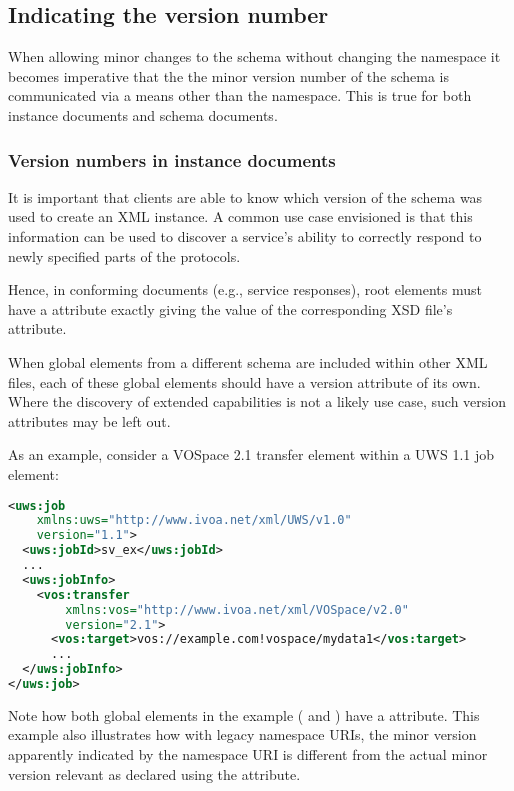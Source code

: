 \documentclass[10pt,a4paper]{ivoa}
\begin{document}
\subsection{Indicating the version number}

When allowing minor changes to the schema without changing the
namespace it becomes imperative that the the minor version number of the schema
is communicated via a means other than the namespace.  This is true for
both instance documents and schema documents.

\subsubsection{Version numbers in instance documents}

It is important that
clients are able to know which version of the schema was used to create an XML
instance.  A common use case envisioned is that
this information can be used to discover a service's ability to
correctly respond to newly specified parts of the protocols. 

Hence, in conforming documents (e.g., service responses), 
root elements must have
a 
attribute exactly giving the value of the corresponding XSD file's
 attribute.

When global elements from a different schema are included within other
XML files, each of these global elements should have a version attribute
of its own.  Where the discovery of extended capabilities is not a
likely use case, such version attributes may be left out.

As an example, consider a VOSpace 2.1 transfer element within a UWS 1.1
job element:

\begin{lstlisting}[language=xml]
<uws:job 
    xmlns:uws="http://www.ivoa.net/xml/UWS/v1.0" 
    version="1.1">
  <uws:jobId>sv_ex</uws:jobId>
  ...
  <uws:jobInfo>
    <vos:transfer 
        xmlns:vos="http://www.ivoa.net/xml/VOSpace/v2.0"
        version="2.1">
      <vos:target>vos://example.com!vospace/mydata1</vos:target>
      ...
  </uws:jobInfo>
</uws:job>
\end{lstlisting}

Note how both global elements in the example ( and
) have a  attribute.  This example
also illustrates how with legacy namespace URIs, the minor version
apparently indicated by the namespace URI is different from the actual
minor version relevant as declared using the  attribute.
\end{document}
